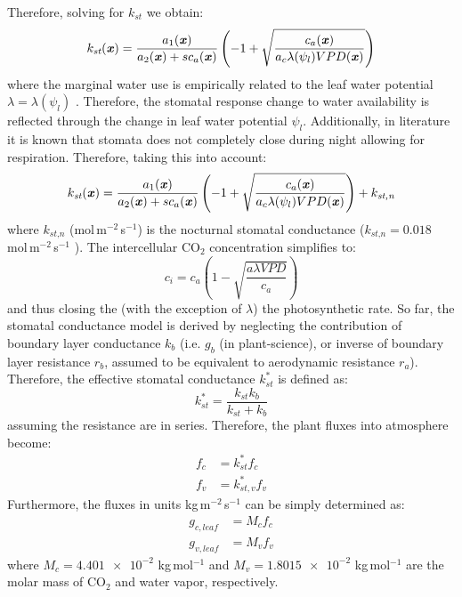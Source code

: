 Therefore, solving for $k_{\textit{st}}$ we obtain:
\begin{equation}
k_{\textit{st}}(\textbf{\textit{x}}) = \frac{a_1(\textbf{\textit{x}}) }{a_2(\textbf{\textit{x}})  + s c_a(\textbf{\textit{x}}) } \left( -1 + \sqrt{\frac{c_a(\textbf{\textit{x}}) }{a_c \lambda(\psi_l)  VPD(\textbf{\textit{x}}) }} \right)
\end{equation}
where the marginal water use is empirically related to the leaf water potential $\lambda = \lambda(\psi_l)$ \citep{Manoli2014,Katul2010}. Therefore, the stomatal response change to water availability is reflected through the change in leaf water potential $\psi_l$.  Additionally, in literature it is known that stomata does not completely close during night allowing for respiration. Therefore, taking this into account:
\begin{equation}
k_{\textit{st}}(\textbf{\textit{x}}) = \frac{a_1(\textbf{\textit{x}}) }{a_2(\textbf{\textit{x}})  + s c_a(\textbf{\textit{x}}) } \left( -1 + \sqrt{\frac{c_a(\textbf{\textit{x}}) }{a_c \lambda(\psi_l)  VPD(\textbf{\textit{x}}) }} \right) + k_{\textit{st,n}}
\end{equation}
where $k_{\textit{st,n}}$ (mol\,m$^{-2}$\,s$^{-1}$) is the nocturnal stomatal conductance ($k_{\textit{st,n}} = 0.018$ mol\,m$^{-2}$\,s$^{-1}$ \citep{Manoli2014}). The intercellular CO$_2$ concentration simplifies to:
\begin{equation}
c_i = c_a \left(1 - \sqrt{\frac{a \lambda \textit{VPD} }{c_a}} \right)
\end{equation}
and thus closing the (with the exception of $\lambda$) the photosynthetic rate. So far, the stomatal conductance model is derived by neglecting the contribution of boundary layer conductance $k_{b}$ (i.e. $g_b$ (in plant-science), or inverse of boundary layer resistance $r_b$, assumed to be equivalent to aerodynamic resistance $r_a$). Therefore, the effective stomatal conductance $k_{st}^*$ is defined as:
\begin{equation}
k_{st}^* = \frac{k_{st} k_b}{k_{st} + k_b}
\end{equation}
assuming the resistance are in series. Therefore, the plant fluxes into atmosphere become:
\begin{align}
	f_{c} &= k_{st}^* f_c \\
	f_{v} &= k_{st,v}^*  f_v
\end{align}
Furthermore, the fluxes in units kg\,m$^{-2}$\,s$^{-1}$ can be simply determined as:
\begin{align}
g_{c,leaf} &= M_c f_c \\
g_{v,leaf} &= M_v f_v
\end{align}
where $M_c = \num{4.401e-2}$ kg\,mol$^{-1}$ and $M_v = \num{1.8015e-2}$ kg\,mol$^{-1}$ are the molar mass of CO$_2$ and water vapor, respectively. 

